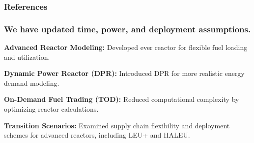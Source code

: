 \documentclass[9pt]{beamer}
\begin{document}




\begin{frame}[allowframebreaks]
  \frametitle{References}
  
  {\footnotesize  }

\end{frame}

\begin{frame}
  \frametitle{We have updated time, power, and deployment assumptions.}
    \textbf{Advanced Reactor Modeling:} Developed \gls{ever} reactor for flexible fuel loading and utilization.

    \vspace{8pt}
    \textbf{Dynamic Power Reactor (DPR):} Introduced DPR for more realistic energy demand modeling.

    \vspace{8pt}
    \textbf{On-Demand Fuel Trading (TOD):} Reduced computational complexity by optimizing reactor calculations.

    \vspace{8pt}
    \textbf{Transition Scenarios:} Examined supply chain flexibility and deployment schemes for advanced reactors, including LEU+ and HALEU.
\end{frame}
\end{document}
